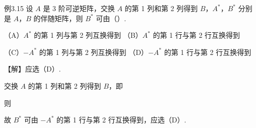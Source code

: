 \begin{fcard}{例3.15}
设 $A$ 是 3 阶可逆矩阵，交换 $A$ 的第 1 列和第 2 列得到 $B$，$A^*$，$B^*$ 分别是 $A$，$B$ 的伴随矩阵，则 $B^*$ 可由（\quad）.

（A）$A^*$ 的第 1 列与第 2 列互换得到 \qquad （B）$A^*$ 的第 1 行与第 2 行互换得到

（C）$-A^*$ 的第 1 列与第 2 列互换得到 \qquad （D）$-A^*$ 的第 1 行与第 2 行互换得到
\end{fcard}

【解】应选（D）.

交换 $A$ 的第 1 列和第 2 列得到 $B$，即


则


故 $B^*$ 可由 $-A^*$ 的第 1 行与第 2 行互换得到，应选（D）.


